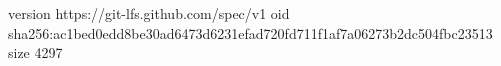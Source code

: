 version https://git-lfs.github.com/spec/v1
oid sha256:ac1bed0edd8be30ad6473d6231efad720fd711f1af7a06273b2dc504fbc23513
size 4297
